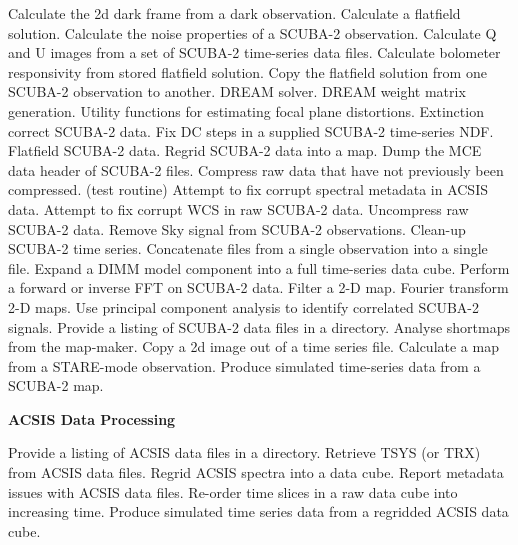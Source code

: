 \documentclass[oneside,11pt]{starlink}
\begin{document}
\begin{description}[itemsep=0.pt]
 Calculate the 2d dark frame from a dark observation.
 Calculate a flatfield solution.
Calculate the noise properties of a SCUBA-2 observation.
Calculate Q and U images from a set of SCUBA-2 time-series data files.
 Calculate bolometer responsivity from stored flatfield solution.
Copy the flatfield solution from one SCUBA-2 observation to another.
 DREAM solver.
 DREAM weight matrix generation.
Utility functions for estimating focal plane distortions.
 Extinction correct SCUBA-2 data.
Fix DC steps in a supplied SCUBA-2 time-series NDF.
 Flatfield SCUBA-2 data.
 Regrid SCUBA-2 data into a map.
 Dump the MCE data header of SCUBA-2 files.
  Compress raw data that have not previously been compressed. (test routine)
  Attempt to fix corrupt spectral metadata in ACSIS data.
  Attempt to fix corrupt WCS in raw SCUBA-2 data.
  Uncompress raw SCUBA-2 data.
  Remove Sky signal from SCUBA-2 observations.
 Clean-up SCUBA-2 time series.
 Concatenate files from a single observation into a single file.
  Expand a DIMM model component into a full time-series data cube.
 Perform a forward or inverse FFT on SCUBA-2 data.
  Filter a 2-D map.
  Fourier transform 2-D maps.
  Use principal component analysis to identify correlated SCUBA-2 signals.
  Provide a listing of SCUBA-2 data files in a directory.
  Analyse shortmaps from the map-maker.
Copy a 2d image out of a time series file.
 Calculate a map from a STARE-mode observation.
  Produce simulated time-series data from a SCUBA-2 map.
\end{description}

{\large
\begin{center}
\textbf{ACSIS Data Processing}
\end{center}
}

\begin{description}[itemsep=0.pt]
  Provide a listing of ACSIS data files in a directory.
Retrieve TSYS (or TRX) from ACSIS data files.
 Regrid ACSIS spectra into a data cube.
 Report metadata issues with ACSIS data files.
 Re-order time slices in a raw data cube into increasing time.
 Produce simulated time series data from a regridded ACSIS data cube.
\end{description}
\end{document}
